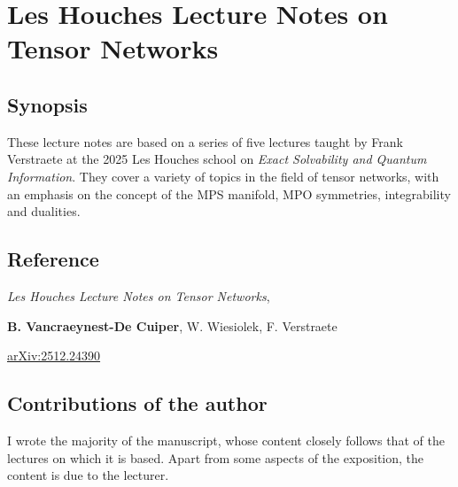 \chapter{Les Houches Lecture Notes on Tensor Networks}
\section{Synopsis}
These lecture notes are based on a series of five lectures taught by Frank Verstraete at the 2025 Les Houches school on \emph{Exact Solvability and Quantum Information}. They cover a variety of topics in the field of tensor networks, with an emphasis on the concept of the MPS manifold, MPO symmetries, integrability and dualities.
\section{Reference}
\textit{Les Houches Lecture Notes on Tensor Networks}, \par\noindent
\textbf{B. Vancraeynest-De Cuiper}, W. Wiesiolek, F. Verstraete \par\noindent
\href{https://doi.org/10.48550/arXiv.2512.24390}{arXiv:2512.24390}
\section{Contributions of the author}
I wrote the majority of the manuscript, whose content closely follows that of the lectures on which it is based. Apart from some aspects of the exposition, the content is due to the lecturer.
%
%
